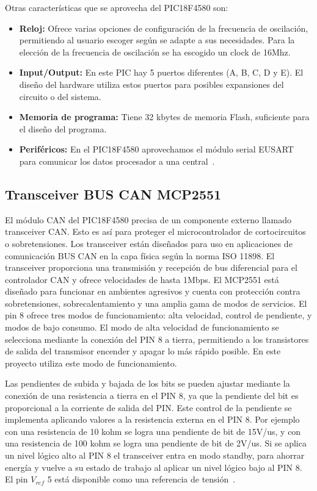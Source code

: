 Otras características que se aprovecha del PIC18F4580 son: 
\begin{itemize}
\item {\textbf{Reloj:}} Ofrece varias opciones de configuración de la frecuencia de oscilación, permitiendo al usuario escoger según se adapte a sus necesidades.
Para la elección de la frecuencia de oscilación se ha escogido un clock de 16Mhz.
\item {\textbf{Input/Output:}} En este PIC hay 5 puertos diferentes (A, B, C, D y E). El diseño del hardware utiliza estos puertos para posibles expansiones del circuito o del sistema. 
\item {\textbf{Memoria de programa:}} Tiene 32 kbytes de memoria Flash, suficiente para el diseño del programa.
\item {\textbf{Periféricos:}} En el PIC18F4580 aprovechamos el módulo serial EUSART para comunicar los datos procesador a una central~\cite{DaP}.

\end{itemize}


\subsection{Transceiver BUS CAN MCP2551}
El módulo CAN del  PIC18F4580 precisa de un componente externo llamado transceiver CAN. 
Esto es así para proteger el microcontrolador de cortocircuitos o sobretensiones. 
Los transceiver están diseñados para uso en aplicaciones de comunicación BUS CAN en la capa física según la norma ISO 11898. 
El transceiver proporciona una transmisión y recepción de bus diferencial para el controlador CAN y ofrece velocidades de hasta 1Mbps.
El MCP2551 está diseñado para funcionar en ambientes agresivos y cuenta con protección contra sobretensiones, sobrecalentamiento y una amplia gama de modos de servicios. 
El pin 8 ofrece tres modos de funcionamiento: alta velocidad, control de pendiente, y modos de bajo consumo.
El modo de alta velocidad de funcionamiento se selecciona mediante la conexión del PIN 8 a tierra, permitiendo a los transistores de salida del transmisor encender y apagar lo más rápido posible. 
En este proyecto utiliza este modo de funcionamiento.

Las pendientes de subida y bajada de los bits se pueden ajustar mediante la conexión de una resistencia a tierra en el PIN 8, ya que la pendiente del bit es proporcional a la corriente de salida del PIN. 
Este control de la pendiente se implementa aplicando valores a la resistencia externa en el PIN 8. 
Por ejemplo con una resistencia de 10 kohm se logra una pendiente de bit de 15V/us,  y con una resistencia de 100 kohm se logra una pendiente de bit de 2V/us. 
Si se aplica un nivel lógico alto al PIN 8 el transceiver entra en modo standby, para ahorrar energía y vuelve a su estado de trabajo al aplicar un nivel lógico bajo al PIN 8. El pin $V_{ref}$ 5 está disponible como una referencia de tensión~\cite{sn}.

